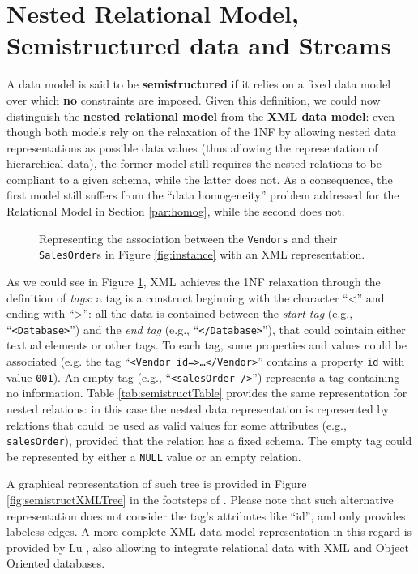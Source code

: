 
\section{Nested Relational Model, Semistructured data and Streams}\label{sec:semistructured}
A data model is said to be \textbf{semistructured} if it relies on a fixed data model over which \textbf{no} constraints are imposed. Given this definition, we could now distinguish the \textbf{nested relational model} from the \textbf{XML data model}: even though both models rely on the relaxation of the 1NF by allowing nested data representations as possible data values (thus allowing the representation of hierarchical data), the former model still requires the nested relations to be compliant to a given schema, while the latter does not. As a consequence, the first model still suffers from the ``data homogeneity'' problem addressed for the Relational Model in Section \vref{par:homog}, while the second does not. 

\begin{figure}[!hpt]

\caption{Representing the association between the \texttt{Vendors} and their \texttt{SalesOrder}s in Figure \ref{fig:instance} with an XML representation.}
\label{fig:semistructXML}
\end{figure}


\begin{example}
	As we could see in Figure \ref{fig:semistructXML}, XML achieves the 1NF relaxation through the definition of \textit{tags}: a tag is a construct beginning with the character ``<'' and ending with ``>'': all the data is contained between the \textit{start tag} (e.g., ``\texttt{<Database>}'') and the \textit{end tag} (e.g., ``\texttt{</Database>}''), that could cointain either textual elements or other tags. To each tag, some properties and values could be associated (e.g. the tag ``\texttt{<Vendor id=\textquotedbl>\dots </Vendor>}'' contains a property \texttt{id} with value \texttt{001}). An empty tag (e.g., ``\texttt{<salesOrder />}'') represents a tag containing no information. Table \ref{tab:semistructTable} provides the same representation for nested relations: in this case the nested data representation is represented by relations that could be used as valid values for some attributes (e.g., \texttt{salesOrder}), provided that the relation has a fixed schema. The empty tag could be represented by either a \texttt{NULL} value or an empty relation. 
	
	A graphical representation of such tree is provided in Figure \ref{fig:semistructXMLTree} in the footsteps of \cite{Magnani06}. Please note that such alternative representation does not consider the tag's attributes like ``id'', and only provides labeless edges. A more complete XML data model representation in this regard is provided by Lu \cite{Lu2006}, also allowing to integrate relational data with XML and Object Oriented databases.
\end{example}

